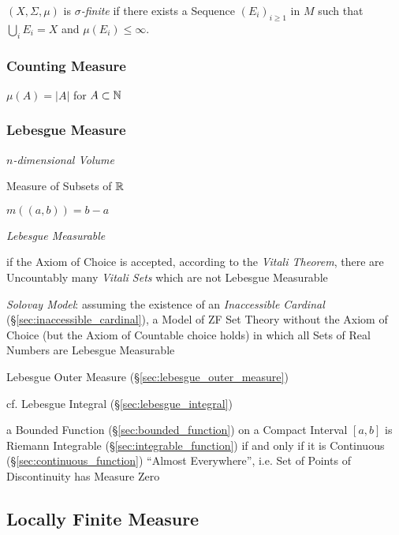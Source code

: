 $(X,\Sigma,\mu)$ is \emph{$\sigma$-finite} if there exists a Sequence
$(E_i)_{i \geq 1}$ in $M$ such that $\bigcup_{i} E_i = X$ and
$\mu(E_i) \leq \infty$.



\subsubsection{Counting Measure}\label{sec:counting_measure}

$\mu(A) = |A|$ for $A \subset \mathbb{N}$



\subsubsection{Lebesgue Measure}\label{sec:lebesgue_measure}

\emph{$n$-dimensional Volume}

Measure of Subsets of $\mathbb{R}$

$m((a,b)) = b - a$

\emph{Lebesgue Measurable}

if the Axiom of Choice is accepted, according to the \emph{Vitali Theorem},
there are Uncountably many \emph{Vitali Sets} which are not Lebesgue Measurable

\emph{Solovay Model}: assuming the existence of an \emph{Inaccessible Cardinal}
(\S\ref{sec:inaccessible_cardinal}), a Model of ZF Set Theory without the Axiom
of Choice (but the Axiom of Countable choice holds) in which all Sets of Real
Numbers are Lebesgue Measurable

Lebesgue Outer Measure (\S\ref{sec:lebesgue_outer_measure})

cf. Lebesgue Integral (\S\ref{sec:lebesgue_integral})

a Bounded Function (\S\ref{sec:bounded_function}) on a Compact Interval $[a,b]$
is Riemann Integrable (\S\ref{sec:integrable_function}) if and only if it is
Continuous (\S\ref{sec:continuous_function}) ``Almost Everywhere'', i.e. Set of
Points of Discontinuity has Measure Zero



\subsection{Locally Finite Measure}\label{sec:locally_finite_measure}

